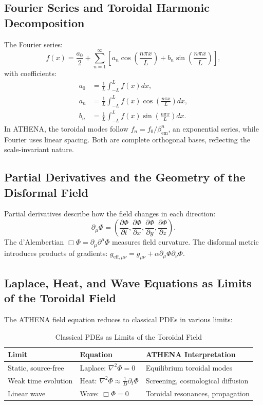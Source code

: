 \documentclass[12pt, a4paper]{article}
\begin{document}
\subsection{Fourier Series and Toroidal Harmonic Decomposition}
\label{sec:fourier}
The Fourier series:
\begin{equation}
f(x) = \frac{a_0}{2} + \sum_{n=1}^{\infty} \left[ a_n \cos\left(\frac{n\pi x}{L}\right) + b_n \sin\left(\frac{n\pi x}{L}\right) \right],
\label{eq:fourier_series}
\end{equation}
with coefficients:
\begin{align}
a_0 &= \frac{1}{L} \int_{-L}^{L} f(x) dx, \\
a_n &= \frac{1}{L} \int_{-L}^{L} f(x) \cos\left(\frac{n\pi x}{L}\right) dx, \\
b_n &= \frac{1}{L} \int_{-L}^{L} f(x) \sin\left(\frac{n\pi x}{L}\right) dx.
\label{eq:fourier_coeffs}
\end{align}
In ATHENA, the toroidal modes follow $f_n = f_0 / \beta_{\mathrm{em}}^n$, an exponential series, while Fourier uses linear spacing. Both are complete orthogonal bases, reflecting the scale-invariant nature.

\subsection{Partial Derivatives and the Geometry of the Disformal Field}
\label{sec:partial_derivatives}
Partial derivatives describe how the field changes in each direction:
\begin{equation}
\partial_\mu \Phi = \left( \frac{\partial \Phi}{\partial t}, \frac{\partial \Phi}{\partial x}, \frac{\partial \Phi}{\partial y}, \frac{\partial \Phi}{\partial z} \right).
\label{eq:phi_gradient}
\end{equation}
The d'Alembertian $\Box \Phi = \partial_\mu \partial^\mu \Phi$ measures field curvature. The disformal metric introduces products of gradients: $g_{\mathrm{eff},\mu\nu} = g_{\mu\nu} + \alpha \partial_\mu \Phi \partial_\nu \Phi$.

\subsection{Laplace, Heat, and Wave Equations as Limits of the Toroidal Field}
\label{sec:pde_limits}
The ATHENA field equation reduces to classical PDEs in various limits:
\begin{table}[h]
\centering
\caption{Classical PDEs as Limits of the Toroidal Field}
\label{tab:pde_limits}
\begin{tabular}{lll}
\toprule
\textbf{Limit} & \textbf{Equation} & \textbf{ATHENA Interpretation} \\
\midrule
Static, source-free & Laplace: $\nabla^2 \Phi = 0$ & Equilibrium toroidal modes \\
Weak time evolution & Heat: $\nabla^2 \Phi \approx \frac{1}{D}\partial_t\Phi$ & Screening, cosmological diffusion \\
Linear wave & Wave: $\Box \Phi = 0$ & Toroidal resonances, propagation \\
\bottomrule
\end{tabular}
\end{table}
\end{document}

